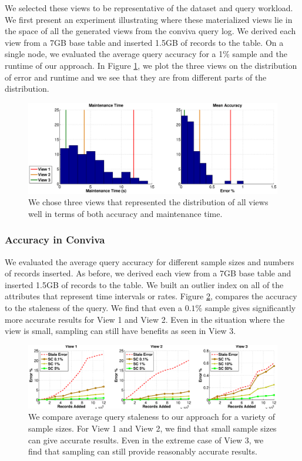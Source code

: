 We selected these views to be representative of the dataset and query workload. 
We first present an experiment illustrating where these materialized views lie in the space of all the generated views from the conviva query log.
We derived each view from a 7GB base table and inserted 1.5GB of records to the table. 
On a single node, we evaluated the average query accuracy for a 1\% sample and the runtime of our approach.
In Figure \ref{exp12conviva}, we plot the three views on the distribution of error and runtime and we see that they 
are from different parts of the distribution.
\begin{figure}[ht!]
\label{exp12conviva}
\centering
\includegraphics[width=\columnwidth]{exp/conviva_efficiency_accuracy.eps}
 \caption{We chose three views that represented the distribution of all views well in terms of both accuracy and maintenance time.}
\end{figure}

\subsubsection{Accuracy in Conviva}
We evaluated the average query accuracy for different sample sizes and numbers of records inserted.
As before, we derived each view from a 7GB base table and inserted 1.5GB of records to the table. 
We built an outlier index on all of the attributes that represent time intervals or rates.
Figure \ref{exp5conviva}, compares the accuracy to the staleness of the query.
We find that even a $0.1\%$ sample gives significantly more accurate results for View 1 and View 2.
Even in the situation where the view is small, sampling can still have benefits as seen in View 3.

\begin{figure}[ht!]
\label{exp5conviva}
\hspace{-3.5em}
\includegraphics[scale=0.22]{exp/exp5-coniva-accuracy-woutlier.eps}
 \caption{We compare average query staleness to our approach for a variety of sample sizes. For View 1 and View 2, we find that small sample sizes can give accurate results. Even in the extreme case of View 3, we find that sampling can still provide reasonably accurate results.}
\end{figure}


